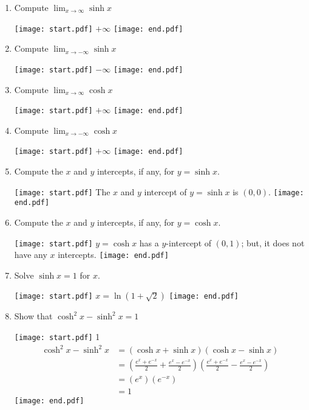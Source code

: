 \documentclass[12pt]{article}
\begin{document}
\begin{enumerate}
\smallskip

\begin{enumerate}

\item Compute $\lim_{x \rightarrow \infty}{\sinh{x}}$

\texttt{[image: start.pdf]}
{{$+\infty$}}
\texttt{[image: end.pdf]}


\item Compute $\lim_{x \rightarrow -\infty}{\sinh{x}}$

\texttt{[image: start.pdf]}
{{$-\infty$}}
\texttt{[image: end.pdf]}


\item Compute $\lim_{x \rightarrow \infty}{\cosh{x}}$

\texttt{[image: start.pdf]}
{{$+\infty$}}
\texttt{[image: end.pdf]}


\item Compute $\lim_{x \rightarrow -\infty}{\cosh{x}}$

\texttt{[image: start.pdf]}
{{$+\infty$}}
\texttt{[image: end.pdf]}


\item Compute the $x$ and $y$ intercepts, if any, for $y=\sinh{x}$.

\texttt{[image: start.pdf]}
{{The $x$ and $y$ intercept of $y=\sinh{x}$ is $(0,0)$.}}
\texttt{[image: end.pdf]}


\item Compute the $x$ and $y$ intercepts, if any, for $y=\cosh{x}$.

\texttt{[image: start.pdf]}
{{$y=\cosh{x}$ has a $y$-intercept of  $(0,1)$; but, it does not have any $x$ intercepts.}}
\texttt{[image: end.pdf]}


\item Solve $\sinh{x}=1$ for $x$.

\texttt{[image: start.pdf]}
{{$x=\ln{\left(1+\sqrt{2}\right)}$}}
\texttt{[image: end.pdf]}


\item Show that $\cosh^2{x}-\sinh^2{x}=1$

\texttt{[image: start.pdf]}
{{{1\linewidth}{
\begin{align*}
\cosh^2{x}-\sinh^{2}{x} & = (\cosh{x}+\sinh{x})(\cosh{x}-\sinh{x})\\
&=\left(\frac{e^x+e^{-x}}{2}+\frac{e^x-e^{-x}}{2}\right)\left(\frac{e^x+e^{-x}}{2}-\frac{e^x-e^{-x}}{2}\right)\\
&=(e^x)(e^{-x})\\
&=1
\end{align*}
}}}
\texttt{[image: end.pdf]}



\end{enumerate}
\end{enumerate}
\end{document}
